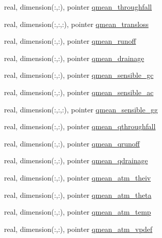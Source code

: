 \begin{DoxyCompactItemize}
\item 
real, dimension(\+:,\+:), pointer \hyperlink{structed__state__vars_1_1edtype_ab478e49c7f2684e6db2e73f6f75ba363}{qmean\+\_\+throughfall}
\item 
real, dimension(\+:,\+:,\+:), pointer \hyperlink{structed__state__vars_1_1edtype_a7a4e346c00e255c2bb737a1d43955c6a}{qmean\+\_\+transloss}
\item 
real, dimension(\+:,\+:), pointer \hyperlink{structed__state__vars_1_1edtype_ad5b968c5d79d6f5869f9206439633be7}{qmean\+\_\+runoff}
\item 
real, dimension(\+:,\+:), pointer \hyperlink{structed__state__vars_1_1edtype_af84579dc69816fca9887170ef7f8ed27}{qmean\+\_\+drainage}
\item 
real, dimension(\+:,\+:), pointer \hyperlink{structed__state__vars_1_1edtype_ac0ab6895a69f7083dceb3da32de04b3a}{qmean\+\_\+sensible\+\_\+gc}
\item 
real, dimension(\+:,\+:), pointer \hyperlink{structed__state__vars_1_1edtype_ac93105537c5340fb9278f3a1e2488425}{qmean\+\_\+sensible\+\_\+ac}
\item 
real, dimension(\+:,\+:,\+:), pointer \hyperlink{structed__state__vars_1_1edtype_ac660a79021d863a2964cfbc61e22f3e7}{qmean\+\_\+sensible\+\_\+gg}
\item 
real, dimension(\+:,\+:), pointer \hyperlink{structed__state__vars_1_1edtype_a6836f913474b69870d2c5b8ce80eb423}{qmean\+\_\+qthroughfall}
\item 
real, dimension(\+:,\+:), pointer \hyperlink{structed__state__vars_1_1edtype_a93f01a37d1879e7311b18655ece71ca7}{qmean\+\_\+qrunoff}
\item 
real, dimension(\+:,\+:), pointer \hyperlink{structed__state__vars_1_1edtype_a4534c295e8c44638cc13ef572004baa4}{qmean\+\_\+qdrainage}
\item 
real, dimension(\+:,\+:), pointer \hyperlink{structed__state__vars_1_1edtype_ad1d76693e881b2776e0ddb056f1de4c5}{qmean\+\_\+atm\+\_\+theiv}
\item 
real, dimension(\+:,\+:), pointer \hyperlink{structed__state__vars_1_1edtype_a6a1c329af29b4d4f3f9f5f4da6269b31}{qmean\+\_\+atm\+\_\+theta}
\item 
real, dimension(\+:,\+:), pointer \hyperlink{structed__state__vars_1_1edtype_a92ac64b2ef3dbb40fc22300acd8d4e60}{qmean\+\_\+atm\+\_\+temp}
\item 
real, dimension(\+:,\+:), pointer \hyperlink{structed__state__vars_1_1edtype_aa1aade39f4fea0729d38fb7d00b11b07}{qmean\+\_\+atm\+\_\+vpdef}
\item 

\end{DoxyCompactItemize}
